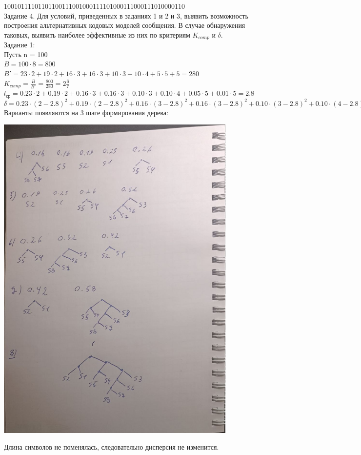 \documentclass[a4paper,14pt]{extarticle}
\begin{document}
10010111101101100111001000111101000111000111010000110\\
Задание 4. Для условий, приведенных в заданиях 1 и 2 и 3, выявить
возможность построения альтернативных кодовых моделей сообщения. В
случае обнаружения таковых, выявить наиболее эффективные из них по
критериям $K_{comp}$ и $\delta$.\\
Задание 1:\\
Пусть n = 100\\
$B = 100 \cdot 8 = 800$\\
$B' = 23 \cdot 2 + 19 \cdot 2 + 16 \cdot 3 + 16 \cdot 3 + 10 \cdot 3 + 10 \cdot 4 + 5 \cdot 5 + 5 = 280$\\
$K_{comp} = \frac{B}{B'} = \frac{800}{280} = 2\frac{6}{7}$\\
$l_{ср} = 0.23 \cdot 2 + 0.19 \cdot 2 + 0.16 \cdot 3 + 0.16 \cdot 3 + 0.10 \cdot 3 + 0.10 \cdot 4 + 0.05 \cdot 5 + 0.01 \cdot 5 = 2.8$\\
$\delta = 0.23 \cdot (2 - 2.8)^2 + 0.19 \cdot (2 - 2.8)^2 + 0.16 \cdot (3 - 2.8)^2 + 0.16 \cdot (3 - 2.8)^2 + 0.10 \cdot (3 - 2.8)^2 + 0.10 \cdot (4 - 2.8)^2 + 0.05 \cdot (5 - 2.8)^2 + 0.01 \cdot (5 - 2.8)^2 = 0.72$\\

Варианты появляются на 3 шаге формирования дерева:
\begin{center}
    \includegraphics[width=120mm]{task1_var1.jpg}\\
\end{center}
Длина символов не поменялась, следовательно дисперсия не изменится.\\
\end{document}
